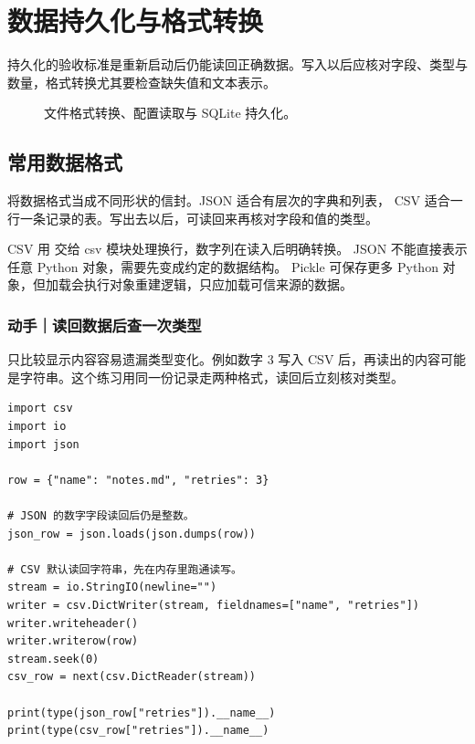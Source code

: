 \documentclass[UTF8,a4paper,oneside,openany,fontset=none,11pt]{ctexbook}
\newcommand{\code}[1]{\texttt{\detokenize{#1}}}
\begin{document}
\chapter{数据持久化与格式转换}
\label{ch:10-outline}

持久化的验收标准是重新启动后仍能读回正确数据。写入以后应核对字段、类型与数量，格式转换尤其要检查缺失值和文本表示。


\begin{figure}[htbp]
  \centering
  \caption*{文件格式转换、配置读取与 SQLite 持久化。}
\end{figure}


\section{常用数据格式}

将数据格式当成不同形状的信封。JSON 适合有层次的字典和列表，
CSV 适合一行一条记录的表。写出去以后，可读回来再核对字段和值的类型。

CSV 用 \code{newline=""} 交给 csv 模块处理换行，数字列在读入后明确转换。
JSON 不能直接表示任意 Python 对象，需要先变成约定的数据结构。
Pickle 可保存更多 Python 对象，但加载会执行对象重建逻辑，只应加载可信来源的数据。

\subsection*{动手｜读回数据后查一次类型}

只比较显示内容容易遗漏类型变化。例如数字 3 写入 CSV 后，再读出的内容可能是字符串。这个练习用同一份记录走两种格式，读回后立刻核对类型。

\begin{lstlisting}[title={\code{round_trip.py}}]
import csv
import io
import json

row = {"name": "notes.md", "retries": 3}

# JSON 的数字字段读回后仍是整数。
json_row = json.loads(json.dumps(row))

# CSV 默认读回字符串，先在内存里跑通读写。
stream = io.StringIO(newline="")
writer = csv.DictWriter(stream, fieldnames=["name", "retries"])
writer.writeheader()
writer.writerow(row)
stream.seek(0)
csv_row = next(csv.DictReader(stream))

print(type(json_row["retries"]).__name__)
print(type(csv_row["retries"]).__name__)
\end{lstlisting}
\end{document}
